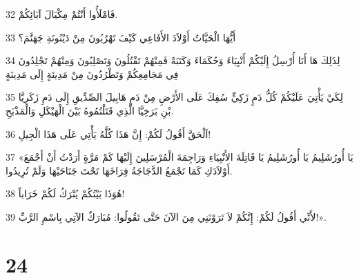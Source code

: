 \par 32 فَامْلَأُوا أَنْتُمْ مِكْيَالَ آبَائِكُمْ.
\par 33 أَيُّهَا الْحَيَّاتُ أَوْلاَدَ الأَفَاعِي كَيْفَ تَهْرُبُونَ مِنْ دَيْنُونَةِ جَهَنَّمَ؟
\par 34 لِذَلِكَ هَا أَنَا أُرْسِلُ إِلَيْكُمْ أَنْبِيَاءَ وَحُكَمَاءَ وَكَتَبَةً فَمِنْهُمْ تَقْتُلُونَ وَتَصْلِبُونَ وَمِنْهُمْ تَجْلِدُونَ فِي مَجَامِعِكُمْ وَتَطْرُدُونَ مِنْ مَدِينَةٍ إِلَى مَدِينَةٍ
\par 35 لِكَيْ يَأْتِيَ عَلَيْكُمْ كُلُّ دَمٍ زَكِيٍّ سُفِكَ عَلَى الأَرْضِ مِنْ دَمِ هَابِيلَ الصِّدِّيقِ إِلَى دَمِ زَكَرِيَّا بْنِ بَرَخِيَّا الَّذِي قَتَلْتُمُوهُ بَيْنَ الْهَيْكَلِ وَالْمَذْبَحِ.
\par 36 اَلْحَقَّ أَقُولُ لَكُمْ: إِنَّ هَذَا كُلَّهُ يَأْتِي عَلَى هَذَا الْجِيلِ!
\par 37 «يَا أُورُشَلِيمُ يَا أُورُشَلِيمُ يَا قَاتِلَةَ الأَنْبِيَاءِ وَرَاجِمَةَ الْمُرْسَلِينَ إِلَيْهَا كَمْ مَرَّةٍ أَرَدْتُ أَنْ أَجْمَعَ أَوْلاَدَكِ كَمَا تَجْمَعُ الدَّجَاجَةُ فِرَاخَهَا تَحْتَ جَنَاحَيْهَا وَلَمْ تُرِيدُوا.
\par 38 هُوَذَا بَيْتُكُمْ يُتْرَكُ لَكُمْ خَرَاباً!
\par 39 لأَنِّي أَقُولُ لَكُمْ: إِنَّكُمْ لاَ تَرَوْنَنِي مِنَ الآنَ حَتَّى تَقُولُوا: مُبَارَكٌ الآتِي بِاسْمِ الرَّبِّ!».

\chapter{24}

